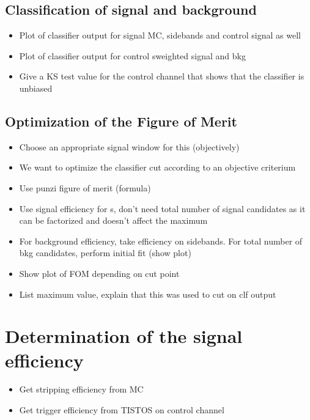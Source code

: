 \subsection{Classification of signal and background}

\begin{itemize}
  \item Plot of classifier output for signal MC, sidebands and control signal as well
  \item Plot of classifier output for control sweighted signal and bkg
  \item Give a KS test value for the control channel that shows that the classifier is unbiased
\end{itemize}

\subsection{Optimization of the Figure of Merit}

\begin{itemize}
  \item Choose an appropriate signal window for this (objectively)
  \item We want to optimize the classifier cut according to an objective criterium
  \item Use punzi figure of merit (formula)
  \item Use signal efficiency for s, don't need total number of signal candidates as it can be factorized and doesn't affect the maximum
  \item For background efficiency, take efficiency on sidebands. For total number of bkg candidates, perform initial fit (show plot)
  \item Show plot of FOM depending on cut point
  \item List maximum value, explain that this was used to cut on clf output
\end{itemize}

\section{Determination of the signal efficiency}

\begin{itemize}
  \item Get stripping efficiency from MC
  \item Get trigger efficiency from TISTOS on control channel
\end{itemize}

